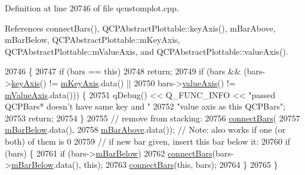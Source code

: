 Definition at line 20746 of file qcustomplot.\+cpp.



References connect\+Bars(), Q\+C\+P\+Abstract\+Plottable\+::key\+Axis(), m\+Bar\+Above, m\+Bar\+Below, Q\+C\+P\+Abstract\+Plottable\+::m\+Key\+Axis, Q\+C\+P\+Abstract\+Plottable\+::m\+Value\+Axis, and Q\+C\+P\+Abstract\+Plottable\+::value\+Axis().


\begin{DoxyCode}
20746                                      \{
20747   \textcolor{keywordflow}{if} (bars == \textcolor{keyword}{this})
20748     \textcolor{keywordflow}{return};
20749   \textcolor{keywordflow}{if} (bars && (bars->\hyperlink{class_q_c_p_abstract_plottable_a72c7a09c22963f2c943f07112b311103}{keyAxis}() != \hyperlink{class_q_c_p_abstract_plottable_a426f42e254d0f8ce5436a868c61a6827}{mKeyAxis}.data() ||
20750                bars->\hyperlink{class_q_c_p_abstract_plottable_a3106f9d34d330a6097a8ec5905e5b519}{valueAxis}() != \hyperlink{class_q_c_p_abstract_plottable_a2901452ca4aea911a1827717934a4bda}{mValueAxis}.data())) \{
20751     qDebug() << Q\_FUNC\_INFO << \textcolor{stringliteral}{"passed QCPBars* doesn't have same key and "}
20752                                \textcolor{stringliteral}{"value axis as this QCPBars"};
20753     \textcolor{keywordflow}{return};
20754   \}
20755   \textcolor{comment}{// remove from stacking:}
20756   \hyperlink{class_q_c_p_bars_a6ea37802cd22f97235cab614b14b9f19}{connectBars}(
20757       \hyperlink{class_q_c_p_bars_ad51db970eed7e286f2753b0216fc56de}{mBarBelow}.data(),
20758       \hyperlink{class_q_c_p_bars_a0c1c46076c41a478dbb373cfd35929aa}{mBarAbove}.data()); \textcolor{comment}{// Note: also works if one (or both) of them is 0}
20759   \textcolor{comment}{// if new bar given, insert this bar below it:}
20760   \textcolor{keywordflow}{if} (bars) \{
20761     \textcolor{keywordflow}{if} (bars->\hyperlink{class_q_c_p_bars_ad51db970eed7e286f2753b0216fc56de}{mBarBelow})
20762       \hyperlink{class_q_c_p_bars_a6ea37802cd22f97235cab614b14b9f19}{connectBars}(bars->\hyperlink{class_q_c_p_bars_ad51db970eed7e286f2753b0216fc56de}{mBarBelow}.data(), \textcolor{keyword}{this});
20763     \hyperlink{class_q_c_p_bars_a6ea37802cd22f97235cab614b14b9f19}{connectBars}(\textcolor{keyword}{this}, bars);
20764   \}
20765 \}
\end{DoxyCode}


